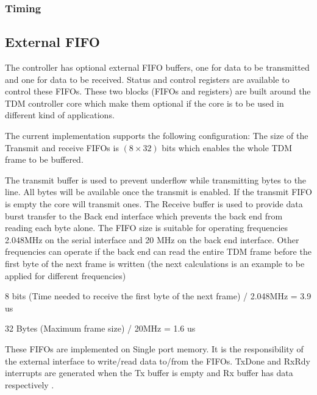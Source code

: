 \documentclass[a4paper,11pt]{article}
\begin{document}
\subsubsection{Timing}


\subsection{External FIFO}
The controller has optional external FIFO buffers, one for data to be transmitted and one for data to be received. Status and control registers are available to control these FIFOs. These two blocks (FIFOs and registers) are  built around the TDM controller core which make them optional if the core is to be used in different kind of applications.

The current implementation supports the following configuration: 
The size of the Transmit and receive FIFOs is $(8\times 32)$ bits which enables the whole TDM frame to be buffered.

The transmit buffer is used to prevent underflow while transmitting bytes to the line. All bytes will be available once the transmit is enabled. If the transmit FIFO is empty the core will transmit ones. The Receive buffer is used to provide data burst transfer to the Back end interface which prevents the back end from reading each byte alone. The FIFO size is suitable for operating frequencies 2.048MHz on the serial interface and 20 MHz on the back end interface. Other frequencies can operate if the back end can read the entire TDM frame before the first byte of the next frame is written (the next calculations is an example to be applied for different frequencies)

8 bits (Time needed to receive the first byte of the next frame) / 2.048MHz = 3.9 us

32 Bytes (Maximum frame size) / 20MHz = 1.6 us

These FIFOs are implemented on Single port memory. It is the responsibility of the external interface to write/read data to/from the FIFOs. TxDone and RxRdy interrupts are generated when the Tx buffer is empty and Rx buffer has data respectively .
\end{document}
